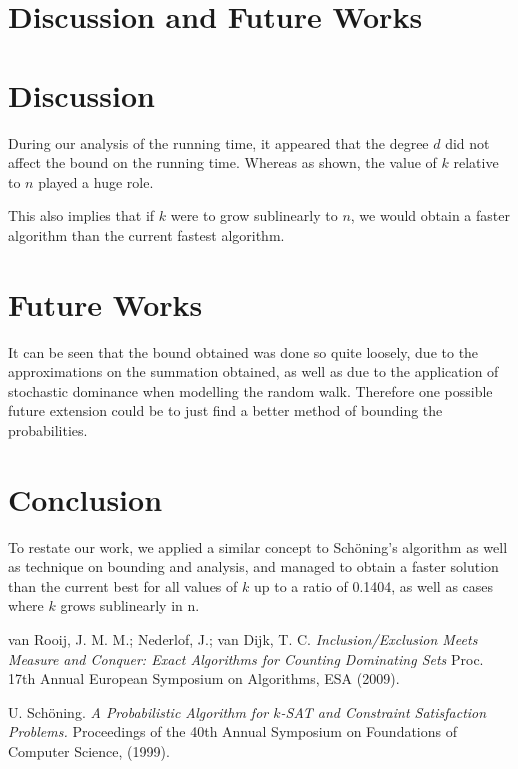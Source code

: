 \documentclass{article}
\begin{document}
\section{Discussion and Future Works}
	\section{Discussion}
	During our analysis of the running time, it appeared that the degree $d$ did not affect the bound on the running time. Whereas as shown, the value of $k$ relative to $n$ played a huge role.\par
	
	This also implies that if $k$ were to grow sublinearly to $n$, we would obtain a faster algorithm than the current fastest algorithm.\par
	\section{Future Works}
	It can be seen that the bound obtained was done so quite loosely, due to the approximations on the summation obtained, as well as due to the application of stochastic dominance when modelling the random walk. Therefore one possible future extension could be to just find a better method of bounding the probabilities.\par
	
\section{Conclusion}	
	To restate our work, we applied a similar concept to Sch\"{o}ning's algorithm as well as technique on bounding and analysis, and managed to obtain a faster solution than the current best for all values of $k$ up to a ratio of 0.1404, as well as cases where $k$ grows sublinearly in n.\par


\begin{thebibliography}{9}
	van Rooij, J. M. M.; Nederlof, J.; van Dijk, T. C. \textit{Inclusion/Exclusion Meets Measure and Conquer: Exact Algorithms for Counting Dominating Sets}
	Proc. 17th Annual European Symposium on Algorithms, ESA (2009).
	
	
	U. Sch\"{o}ning.
	\textit{A Probabilistic Algorithm for $k$-SAT and Constraint Satisfaction Problems.} Proceedings of the 40th Annual Symposium on Foundations of Computer Science, (1999).
\end{thebibliography}
\end{document}
